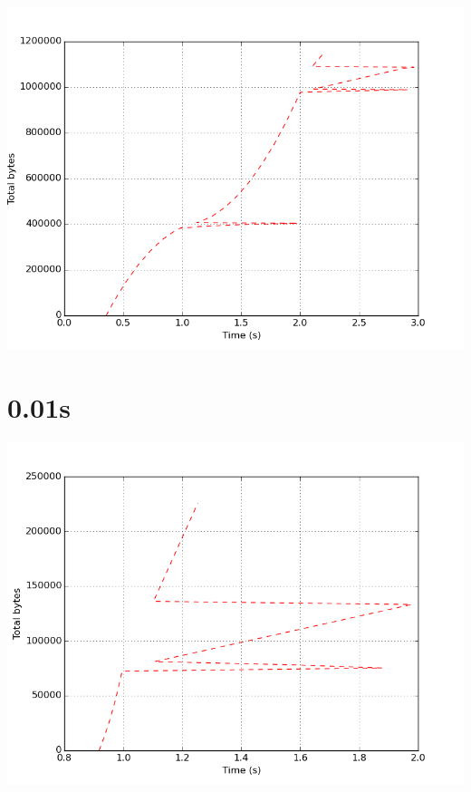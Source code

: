 \documentclass{article}
\begin{document}
    \begin{center}
    \includegraphics{set_a_0.1s/set_a_0_1s.png}
    \end{center}
\clearpage

\section{0.01s}
    \noindent\begin{minipage}{.45\textwidth}
    
    \end{minipage}\hfill
    \begin{minipage}{.45\textwidth}
    
    \end{minipage}
    
    \begin{center}
    \includegraphics{set_a_0.01s/set_a_0_01s.png}
    \end{center}
\clearpage


\end{document}
